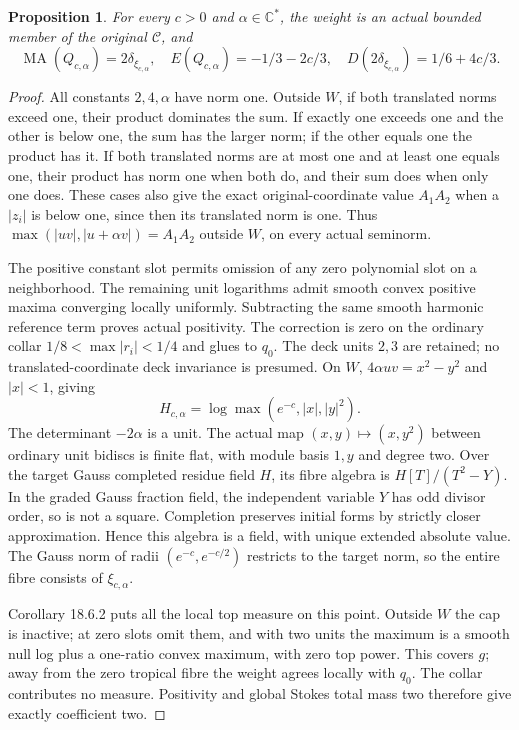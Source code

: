 \documentclass[11pt]{article}
\newtheorem{proposition}[theorem]{Proposition}
\newcommand{\MA}{\operatorname{MA}}
\newcommand{\C}{\mathcal C}
\begin{document}
\begin{proposition}\label{pencil}
For every $c>0$ and $\alpha\in\mathbb C^*$, the weight is an actual
bounded member of the original $\C$, and
\[
 \MA(Q_{c,\alpha})=2\delta_{\xi_{c,\alpha}},\quad
 E(Q_{c,\alpha})=-1/3-2c/3,\quad
 D(2\delta_{\xi_{c,\alpha}})=1/6+4c/3.
\]
\end{proposition}
\begin{proof}
All constants $2,4,\alpha$ have norm one. Outside $W$, if both translated
norms exceed one, their product dominates the sum. If exactly one exceeds
one and the other is below one, the sum has the larger norm; if the other
equals one the product has it. If both translated norms are at most one
and at least one equals one, their product has norm one when both do,
and their sum does when only one does. These cases also give the exact
original-coordinate value $A_1A_2$ when a $|z_i|$ is below one, since
then its translated norm is one. Thus
$\max(|uv|,|u+\alpha v|)=A_1A_2$ outside $W$, on every actual seminorm.

The positive constant slot permits omission of any zero polynomial slot
on a neighborhood. The remaining unit logarithms admit smooth convex
positive maxima converging locally uniformly. Subtracting the same smooth
harmonic reference term proves actual positivity. The correction is zero
on the ordinary collar $1/8<\max|r_i|<1/4$ and glues to $q_0$.
The deck units $2,3$ are retained; no translated-coordinate deck invariance
is presumed. On $W$, $4\alpha uv=x^2-y^2$ and $|x|<1$, giving
\[
 H_{c,\alpha}=\log\max(e^{-c},|x|,|y|^2).
\]
The determinant $-2\alpha$ is a unit. The actual map
$(x,y)\mapsto(x,y^2)$ between ordinary unit bidiscs is finite flat,
with module basis $1,y$ and degree two. Over the target Gauss completed
residue field $H$, its fibre algebra is $H[T]/(T^2-Y)$. In the graded
Gauss fraction field, the independent variable $Y$ has odd divisor order,
so is not a square. Completion preserves initial forms by strictly closer
approximation. Hence this algebra is a field, with unique extended
absolute value. The Gauss norm of radii $(e^{-c},e^{-c/2})$ restricts to
the target norm, so the entire fibre consists of $\xi_{c,\alpha}$.

Corollary 18.6.2 puts all the local top measure on this point. Outside
$W$ the cap is inactive; at zero slots omit them, and with two units the
maximum is a smooth null log plus a one-ratio convex maximum, with zero
top power. This covers $g$; away from the zero tropical fibre the weight
agrees locally with $q_0$. The collar contributes no measure. Positivity
and global Stokes total mass two therefore give exactly coefficient two.


\end{proof}
\end{document}
